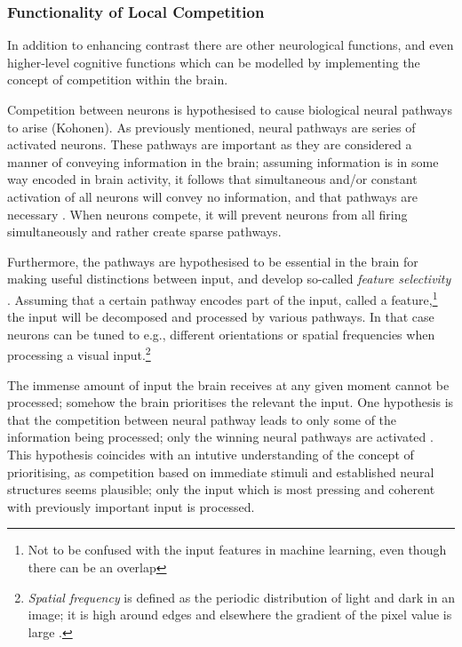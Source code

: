         
    \subsubsection{Functionality of Local Competition}
        In addition to enhancing contrast there are other neurological functions, and even higher-level cognitive functions which can be modelled by implementing the concept of competition within the brain.
        
        Competition between neurons is hypothesised to cause biological neural pathways to arise (Kohonen).
        As previously mentioned, neural pathways are series of activated neurons. These pathways are important as they are considered a manner of conveying information in the brain; assuming information is in some way encoded in brain activity, it follows that simultaneous and/or constant activation of all neurons will convey no information, and that pathways are necessary \citep{Chen}. When neurons compete, it will prevent neurons from all firing simultaneously and rather create sparse pathways. 
        
        Furthermore, the pathways are hypothesised to be essential in the brain for making useful distinctions between input, and develop so-called \textit{feature selectivity} \citep{Chen}. Assuming that a certain pathway encodes part of the input, called a feature,\footnote{Not to be confused with the input features in machine learning, even though there can be an overlap} the input will be decomposed and processed by various pathways. In that case neurons can be tuned to e.g., different orientations or spatial frequencies when processing a visual input.\footnote{\textit{Spatial frequency} is defined as the periodic distribution of light and dark in an image; it is high around edges and elsewhere the gradient of the pixel value is large .}
        
        The immense amount of input the brain receives at any given moment cannot be processed; somehow the brain prioritises the relevant the input. One hypothesis is that the competition between neural pathway leads to only some of the information being processed; only the winning neural pathways are activated \citep{Chen}. This hypothesis coincides with an intutive understanding of the concept of prioritising, as competition based on immediate stimuli and established neural structures seems plausible; only the input which is most pressing and coherent with previously important input is processed. 
        
